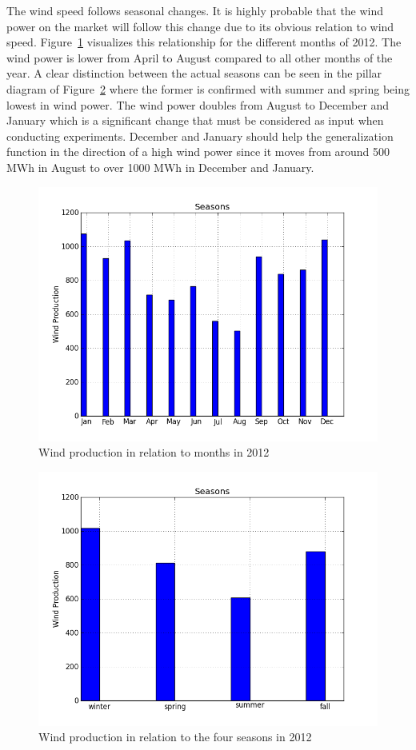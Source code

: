 The wind speed follows seasonal changes. It is highly probable that the wind power on the market will follow this change due to its obvious relation to wind speed. Figure~\ref{fig:windProductionMonths} visualizes this relationship for the different months of 2012. The wind power is lower from April to August compared to all other months of the year. A clear distinction between the actual seasons can be seen in the pillar diagram of Figure~\ref{fig:windProductionSeasons} where the former is confirmed with summer and spring being lowest in wind power. The wind power doubles from August to December and January which is a significant change that must be considered as input when conducting experiments. December and January should help the generalization function in the direction of a high wind power since it moves from around 500 MWh in August to over 1000 MWh in December and January.

\begin{figure}[ht!]
\centering
\includegraphics[width=0.85\linewidth]{billeder/Seasons/windProductionMonths.png}
\caption{Wind production in relation to months in 2012}
\label{fig:windProductionMonths}
\end{figure}

\begin{figure}[ht!]
\centering
\includegraphics[width=0.85\linewidth]{billeder/Seasons/windProdctionSeasons.png}
\caption{Wind production in relation to the four seasons in 2012}
\label{fig:windProductionSeasons}
\end{figure}

